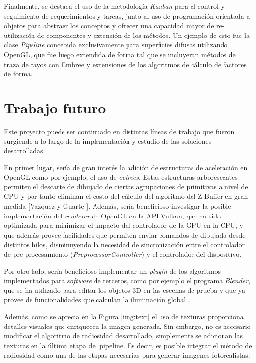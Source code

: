 Finalmente, se destaca el uso de la metodología \textit{Kanban} para el control y seguimiento de requerimientos y tareas, junto al uso de programación orientada a objetos para abstraer los conceptos y ofrecer una capacidad mayor de re-utilización de componentes y extensión de los métodos. Un ejemplo de esto fue la clase \textit{Pipeline} concebida exclusivamente para superficies difusas utilizando OpenGL, que fue luego extendida de forma tal que se incluyeran métodos de traza de rayos con Embree y extensiones de los algoritmos de cálculo de factores de forma. 

\section{Trabajo futuro}
\label{sec:futuro}

Este proyecto puede ser continuado en distintas líneas de trabajo que fueron surgiendo a lo largo de la implementación y estudio de las soluciones desarrolladas.

En primer lugar, sería de gran interés la adición de estructuras de aceleración en OpenGL como por ejemplo, el uso de \textit{octrees}. Estas estructuras arborescentes permiten el descarte de dibujado de ciertas agrupaciones de primitivas a nivel de CPU y por tanto eliminan el costo del cálculo del algoritmo del Z-Buffer en gran medida [Vazquez y Guarte \cite{Guarte}]. Además, sería beneficioso investigar la posible implementación del \textit{renderer} de OpenGL en la API Vulkan, que ha sido optimizada para minimizar el impacto del controlador de la GPU en la CPU, y que además provee facilidades que permiten enviar comandos de dibujado desde distintos hilos, disminuyendo la necesidad de sincronización entre el controlador de pre-procesamiento (\textit{PreprocessorController}) y el controlador del dispositivo.

Por otro lado, sería beneficioso implementar un \textit{plugin} de los algoritmos implementados para \textit{software} de terceros, como por ejemplo el programa \textit{Blender}, que se ha utilizado para editar los objetos 3D en las escenas de prueba y que ya provee de funcionalidades que calculan la iluminación global \cite{Blender}.

Además, como se aprecia en la Figura \ref{img:text} el uso de texturas proporciona detalles visuales que enriquecen la imagen generada. Sin embargo, no es necesario modificar el algoritmo de radiosidad desarrollado, simplemente se adicionan las texturas en la última etapa del pipeline. Es decir, es posible integrar el método de radiosidad como una de las etapas necesarias para generar imágenes fotorealistas.

